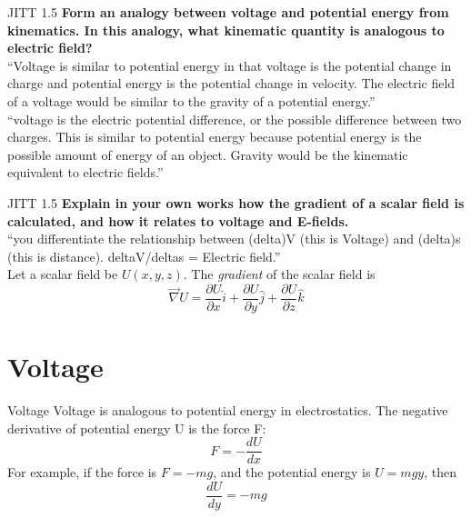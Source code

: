 \documentclass{beamer}
\begin{document}
\begin{frame}{JITT 1.5}
\textbf{Form an analogy between voltage and potential energy from kinematics.  In this analogy, what kinematic quantity is analogous to electric field?} \\
``Voltage is similar to potential energy in that voltage is the potential change in charge and potential energy is the potential change in velocity. The electric field of a voltage would be similar to the gravity of a potential energy.'' \\
``voltage is the electric potential difference, or the possible difference between two charges. This is similar to potential energy because potential energy is the possible amount of energy of an object. Gravity would be the kinematic equivalent to electric fields.'' \\
\end{frame}

\begin{frame}{JITT 1.5}
\textbf{Explain in your own works how the \alert{gradient} of a \alert{scalar field} is calculated, and how it relates to voltage and E-fields.} \\
``you differentiate the relationship between (delta)V (this is Voltage)  and (delta)s (this is distance). deltaV/deltas = Electric field.'' \\ \vspace{0.5cm}
Let a scalar field be $U(x,y,z)$.  The \textit{gradient} of the scalar field is
\begin{equation}
\vec{\nabla} U = \frac{\partial U}{\partial x}\hat{i} + \frac{\partial U}{\partial y}\hat{j} + \frac{\partial U}{\partial z}\hat{k}
\end{equation}
\end{frame}

\section{Voltage}

\begin{frame}{Voltage}
\alert{Voltage} is analogous to potential energy in electrostatics.  The negative derivative of potential energy U is the force F:
\begin{equation}
F = -\frac{dU}{dx}
\end{equation}
For example, if the force is $F = -mg$, and the potential energy is $U = mgy$, then 
\begin{equation}
\frac{dU}{dy} = -mg
\end{equation}
\end{frame}
\end{document}

